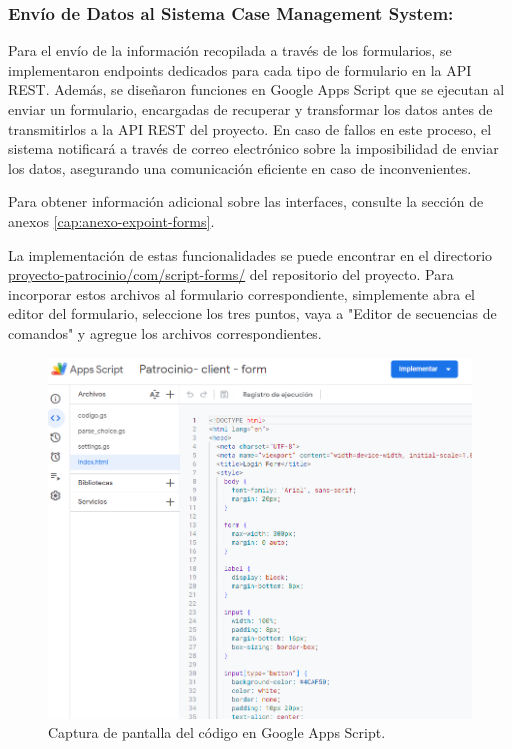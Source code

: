 \subsubsection{Envío de Datos al Sistema Case Management System:}

Para el envío de la información recopilada a través de los formularios, se implementaron endpoints dedicados para cada tipo de formulario en la API REST. Además, se diseñaron funciones en Google Apps Script que se ejecutan al enviar un formulario, encargadas de recuperar y transformar los datos antes de transmitirlos a la API REST del proyecto. En caso de fallos en este proceso, el sistema notificará a través de correo electrónico sobre la imposibilidad de enviar los datos, asegurando una comunicación eficiente en caso de inconvenientes.

Para obtener información adicional sobre las interfaces, consulte la sección de anexos \ref{cap:anexo-expoint-forms}.


La implementación de estas funcionalidades se puede encontrar en el directorio \href{https://github.com/proyecto-patrocinio/proyecto-patrocinio/tree/main/com/script-forms}{proyecto-patrocinio/com/script-forms/} del repositorio del proyecto. Para incorporar estos archivos al formulario correspondiente, simplemente abra el editor del formulario, seleccione los tres puntos, vaya a "Editor de secuencias de comandos" y agregue los archivos correspondientes.




\begin{figure}[H]
\centering
\includegraphics[width=0.75\linewidth]{fig/app-script-code.png}
\caption{Captura de pantalla del código en Google Apps Script.}
\label{fig:app-script-code}
\end{figure}

